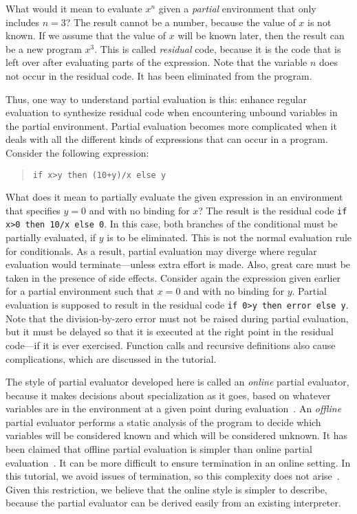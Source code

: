 \documentclass{eptcs}
\begin{document}
What would it mean to evaluate $x^n$ given a \textit{partial}
environment that only includes $n=3$?  The result cannot be a number,
because the value of $x$ is not known.  If we assume that the value of
$x$ will be known later, then the result can be a new program
$x^3$. This is called \textit{residual} code, because it is the code
that is left over after evaluating parts of the expression. Note that
the variable $n$ does not occur in the residual code. It has been
eliminated from the program.

Thus, one way to understand partial evaluation is this: enhance
regular evaluation to synthesize residual code when encountering
unbound variables in the partial environment. Partial evaluation
becomes more complicated when it deals with all the different kinds of
expressions that can occur in a program. Consider the following 
expression:

\begin{quote}
\lstinline{if x>y then (10+y)/x else y} 
\end{quote}

\noindent
What does it mean to partially evaluate the given expression in an
environment that specifies $y=0$ and with no binding for $x$? The
result is the residual code \lstinline{if x>0 then 10/x else 0}. In
this case, both branches of the conditional must be partially
evaluated, if $y$ is to be eliminated. This is not the normal
evaluation rule for conditionals.  As a result, partial evaluation may
diverge where regular evaluation would terminate---unless extra effort
is made. Also, great care must be taken in the presence of side
effects. Consider again the expression given earlier for a partial
environment such that $x=0$ and with no binding for $y$. Partial
evaluation is supposed to result in the residual code
\lstinline{if 0>y then error else y}. Note that the division-by-zero
error must not be raised during partial evaluation, but it must be
delayed so that it is executed at the right point in the residual
code---if it is ever exercised. Function calls and recursive
definitions also cause complications, which are discussed in the
tutorial.

The style of partial evaluator developed here is called an
\textit{online} partial evaluator, because it makes decisions about
specialization as it goes, based on whatever variables are in the
environment at a given point during evaluation~\cite{PartialEvalBookGomard}.  
An \textit{offline}
partial evaluator performs a static analysis of the program to decide
which variables will be considered known and which will be considered
unknown. It has been claimed 
that offline partial evaluation is simpler than online partial
evaluation~\cite{Thiemann95}. It can be more difficult to ensure 
termination in an online setting. In this tutorial, we avoid issues
of termination, so this complexity does not arise~\cite{Shali2011}.
Given this restriction, we believe that the online style is
simpler to describe, because the partial evaluator can be derived easily from an
existing interpreter.
\end{document}
